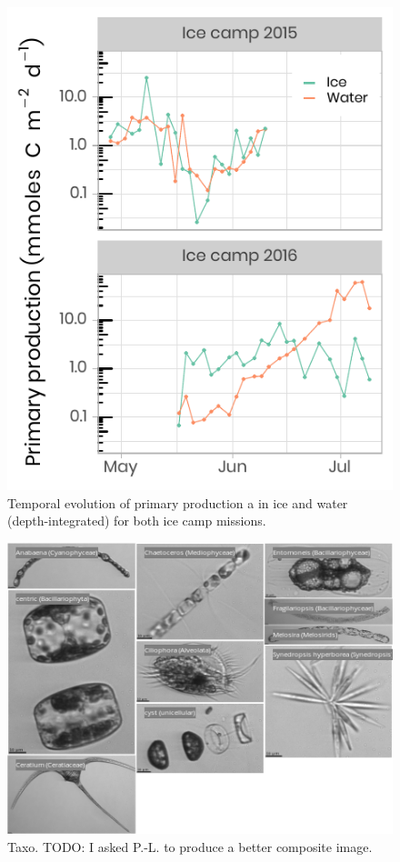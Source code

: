 \documentclass[12pt,a4paper]{scrartcl}
\begin{document}
\begin{figure}[h]
	\centering
	\includegraphics[scale = 2]{../../../graphs/fig10.pdf}
	\caption{Temporal evolution of primary production a in ice and water (depth-integrated) for both ice camp missions.}
\end{figure}

\clearpage
\newpage

\begin{figure}[h]
	\centering
	\includegraphics[scale = 1]{../../../graphs/fig11.png}
	\caption{Taxo. TODO: I asked P.-L. to produce a better composite image.}
\end{figure}
\end{document}
